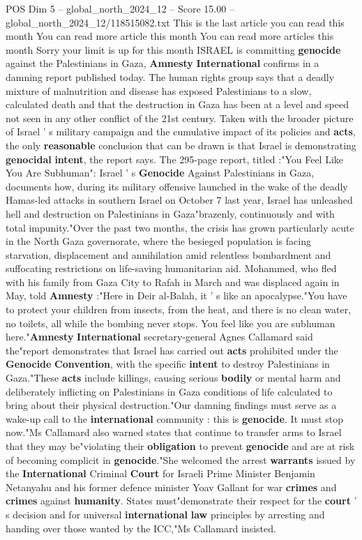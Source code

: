 \begin{textsample}{POS Dim 5 – global\_north\_2024\_12 – Score 15.00 – global\_north\_2024\_12/118515082.txt}  \label{ex:f5_pos_130}
This is the last article you can read this month You can read more article this month You can read more articles this month Sorry your limit is up for this month ISRAEL is committing \textbf{genocide} against the Palestinians in Gaza, \textbf{Amnesty} \textbf{International} confirms in a damning report published today.
The human rights group says that a deadly mixture of malnutrition and disease has exposed Palestinians to a slow, calculated death and that the destruction in Gaza has been at a level and speed not seen in any other conflict of the 21st century.
Taken with the broader picture of Israel ' s military campaign and the cumulative impact of its policies and \textbf{acts}, the only \textbf{reasonable} conclusion that can be drawn is that Israel is demonstrating \textbf{genocidal} \textbf{intent}, the report says.
The 295-page report, titled :"You Feel Like You Are Subhuman": Israel ' s \textbf{Genocide} Against Palestinians in Gaza, documents how, during its military offensive launched in the wake of the deadly Hamas-led attacks in southern Israel on October 7 last year, Israel has unleashed hell and destruction on Palestinians in Gaza"brazenly, continuously and with total impunity."Over the past two months, the crisis has grown particularly acute in the North Gaza governorate, where the besieged population is facing starvation, displacement and annihilation amid relentless bombardment and suffocating restrictions on life-saving humanitarian aid.
Mohammed, who fled with his family from Gaza City to Rafah in March and was displaced again in May, told \textbf{Amnesty} :"Here in Deir al-Balah, it ' s like an apocalypse."You have to protect your children from insects, from the heat, and there is no clean water, no toilets, all while the bombing never stops.
You feel like you are subhuman here."\textbf{Amnesty} \textbf{International} secretary-general Agnes Callamard said the"report demonstrates that Israel has carried out \textbf{acts} prohibited under the \textbf{Genocide} \textbf{Convention}, with the specific \textbf{intent} to destroy Palestinians in Gaza."These \textbf{acts} include killings, causing serious \textbf{bodily} or mental harm and deliberately inflicting on Palestinians in Gaza conditions of life calculated to bring about their physical destruction."Our damning findings must serve as a wake-up call to the \textbf{international} community : this is \textbf{genocide}.
It must stop now."Ms Callamard also warned states that continue to transfer arms to Israel that they may be"violating their \textbf{obligation} to prevent \textbf{genocide} and are at risk of becoming complicit in \textbf{genocide}."She welcomed the arrest \textbf{warrants} issued by the \textbf{International} Criminal \textbf{Court} for Israeli Prime Minister Benjamin Netanyahu and his former defence minister Yoav Gallant for war \textbf{crimes} and \textbf{crimes} against \textbf{humanity}.
States must"demonstrate their respect for the \textbf{court} ' s decision and for universal \textbf{international} \textbf{law} principles by arresting and handing over those wanted by the ICC,"Ms Callamard insisted.


\end{textsample}

